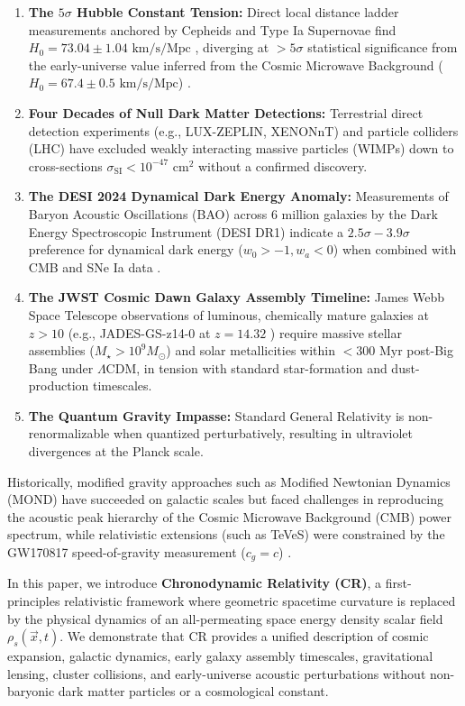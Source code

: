 \documentclass[aps,prd,reprint,superscriptaddress,nofootinbib,floatfix,amsmath,amssymb]{revtex4-2}
\begin{document}
\begin{enumerate}
    \item \textbf{The $5\sigma$ Hubble Constant Tension:} Direct local distance ladder measurements anchored by Cepheids and Type Ia Supernovae find $H_0 = 73.04 \pm 1.04\text{ km/s/Mpc}$ \cite{Riess2022_SH0ES,PantheonPlus2022}, diverging at $>5\sigma$ statistical significance from the early-universe value inferred from the Cosmic Microwave Background ($H_0 = 67.4 \pm 0.5\text{ km/s/Mpc}$) \cite{Planck2018_Cosmology}.
    \item \textbf{Four Decades of Null Dark Matter Detections:} Terrestrial direct detection experiments (e.g., LUX-ZEPLIN, XENONnT) and particle colliders (LHC) have excluded weakly interacting massive particles (WIMPs) down to cross-sections $\sigma_{\text{SI}} < 10^{-47}\text{ cm}^2$ without a confirmed discovery.
    \item \textbf{The DESI 2024 Dynamical Dark Energy Anomaly:} Measurements of Baryon Acoustic Oscillations (BAO) across 6 million galaxies by the Dark Energy Spectroscopic Instrument (DESI DR1) indicate a $2.5\sigma - 3.9\sigma$ preference for dynamical dark energy ($w_0 > -1, w_a < 0$) when combined with CMB and SNe Ia data \cite{DESI2024_BAO}.
    \item \textbf{The JWST Cosmic Dawn Galaxy Assembly Timeline:} James Webb Space Telescope observations of luminous, chemically mature galaxies at $z > 10$ (e.g., JADES-GS-z14-0 at $z=14.32$ \cite{Carniani2024_JADES}) require massive stellar assemblies ($M_\star > 10^9 M_\odot$) and solar metallicities within $<300\text{ Myr}$ post-Big Bang under $\Lambda\text{CDM}$, in tension with standard star-formation and dust-production timescales.
    \item \textbf{The Quantum Gravity Impasse:} Standard General Relativity is non-renormalizable when quantized perturbatively, resulting in ultraviolet divergences at the Planck scale.
\end{enumerate}

Historically, modified gravity approaches such as Modified Newtonian Dynamics (MOND) \cite{McGaugh2016_RAR} have succeeded on galactic scales but faced challenges in reproducing the acoustic peak hierarchy of the Cosmic Microwave Background (CMB) power spectrum, while relativistic extensions (such as TeVeS) were constrained by the GW170817 speed-of-gravity measurement ($c_g = c$) \cite{GW170817}.

In this paper, we introduce \textbf{Chronodynamic Relativity (CR)}, a first-principles relativistic framework where geometric spacetime curvature is replaced by the physical dynamics of an all-permeating space energy density scalar field $\rho_s(\vec{x}, t)$. We demonstrate that CR provides a unified description of cosmic expansion, galactic dynamics, early galaxy assembly timescales, gravitational lensing, cluster collisions, and early-universe acoustic perturbations without non-baryonic dark matter particles or a cosmological constant.
\end{document}
